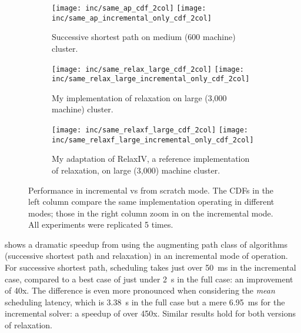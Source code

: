 \begin{figure}
    \begin{widepage}
        \begin{subfigure}[c]{\textwidth}
            \texttt{[image: inc/same\_ap\_cdf\_2col]}
            \texttt{[image: inc/same\_ap\_incremental\_only\_cdf\_2col]}
            \caption{Successive shortest path on medium (600 machine) cluster.}
            \label{fig:inc-same:ssp}
        \end{subfigure}
        \begin{subfigure}[c]{\textwidth}
            \texttt{[image: inc/same\_relax\_large\_cdf\_2col]}                        \texttt{[image: inc/same\_relax\_large\_incremental\_only\_cdf\_2col]}
            \caption{My implementation of relaxation on large (3,000 machine) cluster.}
            \label{fig:inc-same:relax-my}
        \end{subfigure}
        \begin{subfigure}[c]{\textwidth}
            \texttt{[image: inc/same\_relaxf\_large\_cdf\_2col]}
            \texttt{[image: inc/same\_relaxf\_large\_incremental\_only\_cdf\_2col]}
            \caption{My adaptation of RelaxIV, a reference implementation of relaxation, on large (3,000) machine cluster.}
            \label{fig:inc-same:relax-iv}
        \end{subfigure}
    \end{widepage}
    \caption[Performance in incremental vs from scratch mode]{Performance in incremental vs from scratch mode. The CDFs in the left column compare the same implementation operating in different modes; those in the right column zoom in on the incremental mode. All experiments were replicated 5 times.}
    \label{fig:inc-same}
\end{figure}

 shows a dramatic speedup from using the augmenting path class of algorithms (successive shortest path and relaxation) in an incremental mode of operation. For successive shortest path, scheduling takes just over \SI{50}{\milli\second} in the incremental case, compared to a best case of just under \SI{2}{\second} in the full case: an improvement of 40x. The difference is even more pronounced when considering the \emph{mean} scheduling latency, which is \SI{3.38}{\second} in the full case but a mere \SI{6.95}{\milli\second} for the incremental solver: a speedup of over 450x. Similar results hold for both versions of relaxation.

